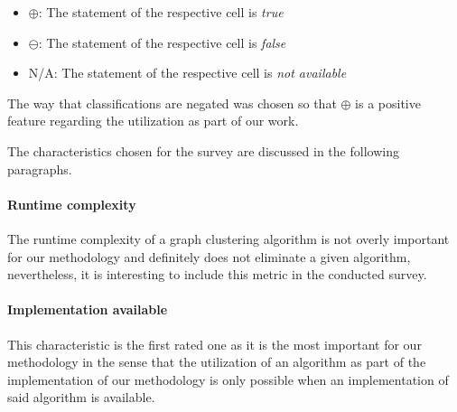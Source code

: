 \documentclass[12pt,a4paper]{report}
\begin{document}
\begin{table}[ht!]
{  \begin{itemize}[noitemsep]
    \item $\oplus$: The statement of the respective cell is \textit{true}
    \item $\ominus$: The statement of the respective cell is \textit{false}
    \item N/A: The statement of the respective cell is \textit{not available}
  \end{itemize}
  The way that classifications are negated was chosen so that $\oplus$
  is a positive feature regarding the utilization as part of our work.
}
\label{table:graph-clustering-survey}
\end{table}

The characteristics chosen for the survey are discussed in the following paragraphs.

\paragraph{Runtime complexity}
The runtime complexity of a graph clustering algorithm is not overly
important for our methodology and definitely does not eliminate a given algorithm,
nevertheless, it is interesting to include this metric in the conducted survey.

\paragraph{Implementation available}
This characteristic is the first rated one as it is the most important for our
methodology in the sense that the utilization of an algorithm as part of
the implementation of our methodology is only possible when an implementation
of said algorithm is available.
\end{document}
